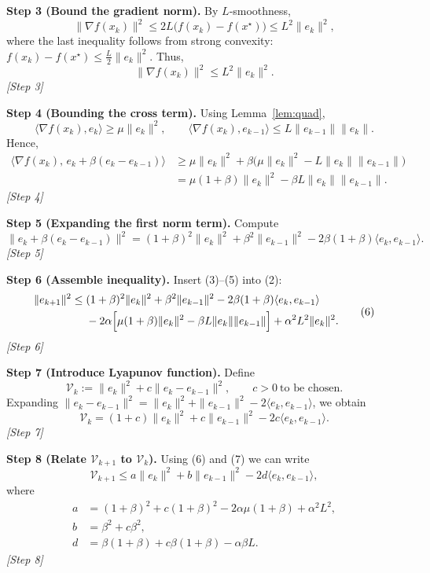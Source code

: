 \documentclass[11pt]{article}
\begin{document}
\noindent\textbf{Step 3 (Bound the gradient norm).}  
By $L$‑smoothness,
\[
\|\nabla f(x_k)\|^{2}\le 2L\bigl(f(x_k)-f(x^{\star})\bigr) \le L^{2}\|e_k\|^{2},
\]
where the last inequality follows from strong convexity:
$f(x_k)-f(x^{\star})\le \tfrac{L}{2}\|e_k\|^{2}$.  
Thus,
\[
\|\nabla f(x_k)\|^{2}\le L^{2}\|e_k\|^{2}. \tag{3}
\]
\textit{[Step 3]}

\noindent\textbf{Step 4 (Bounding the cross term).}  
Using Lemma~\ref{lem:quad},
\[
\langle\nabla f(x_k),e_k\rangle\ge\mu\|e_k\|^{2},\qquad
\langle\nabla f(x_k),e_{k-1}\rangle\le L\|e_{k-1}\|\|e_k\|.
\]
Hence,
\[
\begin{aligned}
\langle\nabla f(x_k),\,e_k+\beta(e_k-e_{k-1})\rangle
&\ge \mu\|e_k\|^{2}+\beta\bigl(\mu\|e_k\|^{2}-L\|e_k\|\|e_{k-1}\|\bigr)\\
&= \mu(1+\beta)\|e_k\|^{2}-\beta L\|e_k\|\|e_{k-1}\|. \tag{4}
\end{aligned}
\]
\textit{[Step 4]}

\noindent\textbf{Step 5 (Expanding the first norm term).}  
Compute
\[
\|e_k+\beta(e_k-e_{k-1})\|^{2}
= (1+\beta)^{2}\|e_k\|^{2}+ \beta^{2}\|e_{k-1}\|^{2}-2\beta(1+\beta)\langle e_k,e_{k-1}\rangle. \tag{5}
\]
\textit{[Step 5]}

\noindent\textbf{Step 6 (Assemble inequality).}  
Insert (3)–(5) into (2):
\[
\begin{aligned}
\|e_{k+1}\|^{2}
\le &\;(1+\beta)^{2}\|e_k\|^{2}+ \beta^{2}\|e_{k-1}\|^{2}
      -2\beta(1+\beta)\langle e_k,e_{k-1}\rangle \\
    &\; -2\alpha\Bigl[\mu(1+\beta)\|e_k\|^{2}-\beta L\|e_k\|\|e_{k-1}\|\Bigr]
      +\alpha^{2}L^{2}\|e_k\|^{2}.
\end{aligned}
\tag{6}
\]
\textit{[Step 6]}

\noindent\textbf{Step 7 (Introduce Lyapunov function).}  
Define
\[
\mathcal{V}_k:=\|e_k\|^{2}+c\|e_k-e_{k-1}\|^{2},\qquad c>0\ \text{to be chosen.}
\]
Expanding $\|e_k-e_{k-1}\|^{2}= \|e_k\|^{2}+\|e_{k-1}\|^{2}-2\langle e_k,e_{k-1}\rangle$, we obtain
\[
\mathcal{V}_k=(1+c)\|e_k\|^{2}+c\|e_{k-1}\|^{2}-2c\langle e_k,e_{k-1}\rangle. \tag{7}
\]
\textit{[Step 7]}

\noindent\textbf{Step 8 (Relate $\mathcal{V}_{k+1}$ to $\mathcal{V}_k$).}  
Using (6) and (7) we can write
\[
\mathcal{V}_{k+1}\le a\|e_k\|^{2}+b\|e_{k-1}\|^{2}-2d\langle e_k,e_{k-1}\rangle,
\]
where
\[
\begin{aligned}
a&=(1+\beta)^{2}+c(1+\beta)^{2}
    -2\alpha\mu(1+\beta)+\alpha^{2}L^{2},\\
b&=\beta^{2}+c\beta^{2},\\
d&=\beta(1+\beta)+c\beta(1+\beta)-\alpha\beta L.
\end{aligned}
\tag{8}
\]
\textit{[Step 8]}
\end{document}
